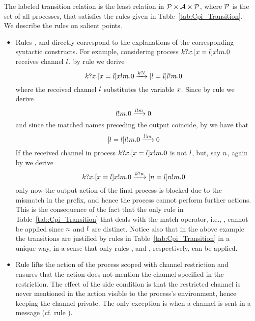 The labeled transition relation is the least relation in ${\cal P}\times{\cal A}\times{\cal P}$, 
where ${\cal P}$ is the set of all processes, that satisfies the rules given in Table~\ref{tab:Cpi_Transition}. 
We describe the rules on salient points.
%
\begin{itemize}
%
%
\item Rules ,  and  directly correspond to the explanations 
of the corresponding syntactic constructs. 
For example, considering process $k?x.[ x = l ]x!m.0$ receives channel $l$,  by rule  we derive 
\[
k?x.[ x = l ]x!m.0
\xrightarrow{k?l}
[ l = l ]l!m.0
\]
%
where the received channel $l$ substitutes the variable $x$.
Since by rule  we derive
\[
l!m.0 
\xrightarrow{l!m}
0
\]
%
and since the matched names preceding the output coincide, by  we have that  
%
\[
[ l = l ]l!m.0
\xrightarrow{l!m}
0
\]
%
If the received channel in process $k?x.[ x = l ]x!m.0$ 
is not $l$, but, say $n$, again by  we derive
%
\[
k?x.[ x = l ]x!m.0
\xrightarrow{k?n}
[ n = l ]n!m.0
\]
%
only now the output action of the final process is blocked due to the mismatch in the prefix, and hence the process cannot perform further actions. 
This is the consequence of the fact that the only rule in Table~\ref{tab:Cpi_Transition} that %
deals with the match operator, i.e., , cannot be applied since $n$ and $l$ are distinct. 
Notice also that in the above example the transitions are justified by rules in Table~\ref{tab:Cpi_Transition} in a unique way, 
in a sense that only rules ,  and , 
respectively, can be applied.
%
%
\item Rule  lifts the action of the process scoped with channel restriction and ensures that the action does not mention the channel specified in the restriction. 
The effect of the side condition is that the restricted channel is never mentioned in the action visible to the process's environment, hence keeping the channel private. The only exception is when a channel is sent in a message (cf. rule ). 

\end{itemize}
